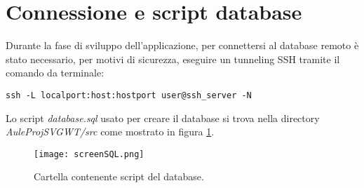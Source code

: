 \section*{Connessione e script database}
Durante la fase di sviluppo dell'applicazione, per connettersi al database remoto è stato necessario, per motivi di sicurezza, eseguire un tunneling SSH tramite il comando da terminale: 
\begin{lstlisting}
ssh -L localport:host:hostport user@ssh_server -N 
\end{lstlisting}
Lo script \emph{database.sql} usato per creare il database si trova nella directory \emph{AuleProjSVGWT/src} come mostrato in figura \ref{fig:dbSQL}.

\begin{figure}[!htb]
\centering%
\texttt{[image: screenSQL.png]}%
\caption{Cartella contenente script del database.}\label{fig:dbSQL}%
\end{figure}

\FloatBarrier
